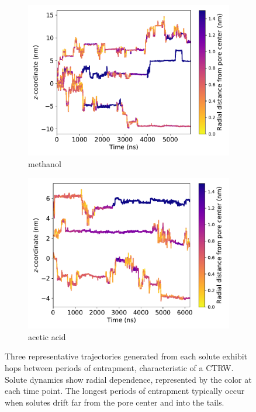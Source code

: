 \documentclass[journal=jctcce,manuscript=article]{achemso}
\begin{document}
\begin{figure}
\begin{subfigure}{0.45\textwidth}
  \includegraphics[width=\textwidth]{MET_trajectories.pdf}
  \caption{methanol}\label{fig:MET_trajectories}
  \end{subfigure}
  \begin{subfigure}{0.45\textwidth}
  \includegraphics[width=\textwidth]{ACH_trajectories.pdf}
  \caption{acetic acid}\label{fig:ACH_trajectories}
  \end{subfigure}
  \caption{Three representative trajectories generated from each solute exhibit hops
	  between periods of entrapment, characteristic of a CTRW. Solute
	  dynamics show radial dependence, represented by the color at each
	  time point. The longest periods of entrapment typically occur when
	  solutes drift far from the pore center and into the tails.
  }\label{fig:solute_trajectories}
  \end{figure}
  
\end{document}
